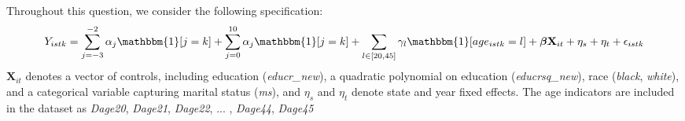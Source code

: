 \documentclass[12pt]{article} %
\begin{document}
Throughout this question, we consider the following specification:
\begin{eqnarray}
	Y_{istk} = \sum_{j = -3}^{-2} \alpha_j \mathbbm{1}[j=k] + \sum_{j = 0}^{10} \alpha_j \mathbbm{1}[j=k] + \sum_{l \in [20,45]} \gamma_l \mathbbm{1}[age_{istk}=l]  + \boldsymbol{\beta} \textbf{X}_{it} + \eta_s +\eta_t + \epsilon_{istk} \label{event_study}
\end{eqnarray}
$\textbf{X}_{it}$  denotes a vector of controls, including education (\textit{educr\_new}), a quadratic polynomial on education  (\textit{educrsq\_new}), race (\textit{black}, \textit{white}), and a categorical variable capturing  marital status (\textit{ms}), and $\eta_s$ and $\eta_t$ denote state and year fixed effects. The age indicators are included in the dataset as \textit{Dage20}, \textit{Dage21}, \textit{Dage22}, ... , \textit{Dage44}, \textit{Dage45}
	
\end{document}
